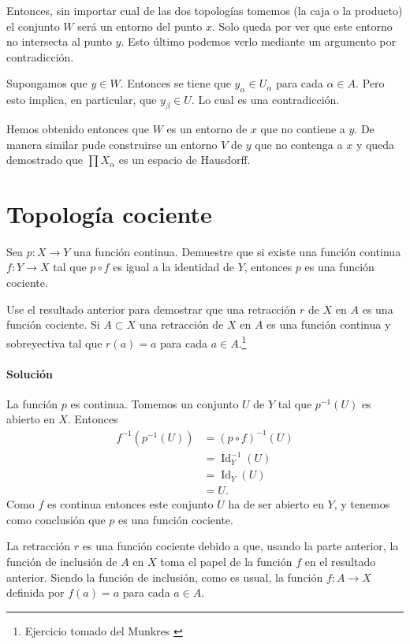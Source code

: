 \documentclass[letterpaper,10pt,final]{article}
\DeclareMathOperator{\Id}{Id}
\begin{document}
Entonces, sin importar cual de las dos topologías tomemos (la caja o la producto)
el conjunto $W$ será un entorno del punto $x$. Solo queda por ver que este entorno
no intersecta al punto $y$. Esto último podemos verlo mediante un argumento por
contradicción.

Supongamos que $y\in W$. Entonces se tiene que $y_\alpha\in U_\alpha$ para cada $\alpha\in A$.
Pero esto implica, en particular, que $y_{\beta}\in U$.
Lo cual es una contradicción.

Hemos obtenido entonces que $W$ es un entorno de $x$ que no contiene a $y$.
De manera similar pude construirse un entorno $V$ de $y$ que no contenga a $x$
y queda demostrado que $\prod X_\alpha$ es un espacio de Hausdorff.

\section{Topología cociente}\label{sec:cociente}

Sea $p\colon X\to Y$ una función continua. Demuestre que si existe una función continua $f\colon Y\to X$ tal que $p\circ f$ es igual a la identidad de $Y$, entonces $p$ es una función cociente.

Use el resultado anterior para demostrar que una retracción  $r$ de $X$ en $A$ es una función cociente. Si $A\subset X$ una retracción de $X$ en $A$ es una función continua y sobreyectiva tal que $r(a)=a$ para cada $a\in A$.\footnote{Ejercicio tomado del Munkres \cite[\S22, Nº 2]{munkres_topology_2014}}

\paragraph{Solución}

La función $p$ es continua. Tomemos un conjunto $U$ de $Y$ tal que $p^{-1}(U)$ es abierto en $X$. Entonces
\begin{align*}
	f^{-1}(p^{-1}(U)) &= (p\circ f)^{-1}(U) \\
					  &= \Id_Y^{-1}(U)\\
					  &= \Id_Y(U)\\
					  &= U.
\end{align*}
Como $f$ es continua entonces este conjunto $U$ ha de ser abierto en $Y$, y tenemos como conclusión que $p$ es una función cociente.

La retracción $r$ es una función cociente debido a que, usando la parte anterior, la función de inclusión de $A$ en $X$ toma el papel de la función $f$ en el resultado anterior. Siendo la función de inclusión, como es usual, la función $f\colon A\to X$ definida por $f(a)=a$ para cada $a\in A$.
\end{document}
